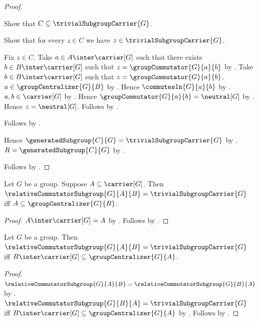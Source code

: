 \begin{proof}
\begin{subproof}
        Show that $C\subseteq\trivialSubgroupCarrier{G}$.
        \begin{subproof}
            Show that for every $z\in C$ we have
                $z\in\trivialSubgroupCarrier{G}$.
            \begin{subproof}
                Fix $z\in C$.
                Take $a\in A\inter\carrier[G]$ such that there exists
                    $b\in B\inter\carrier[G]$ such that
                    $z=\groupCommutator{G}{a}{b}$ by
                    .
                Take $b\in B\inter\carrier[G]$ such that
                    $z=\groupCommutator{G}{a}{b}$.
                $a\in\groupCentralizer{G}{B}$ by .
                Hence $\commutesIn{G}{a}{b}$ by
                    .
                $a,b\in\carrier[G]$ by .
                Hence $\groupCommutator{G}{a}{b}=\neutral[G]$ by
                    .
                Hence $z=\neutral[G]$.
                Follows by
                    .
            \end{subproof}
            Follows by .
        \end{subproof}
        Hence
            $\generatedSubgroup{C}{G}=\trivialSubgroupCarrier{G}$ by
            .
        $R=\generatedSubgroup{C}{G}$ by
            .
    \end{subproof}
    Follows by \auto.
\end{proof}

\begin{corollary}\label{relative_commutator_trivial_iff_subset_centralizer}
    Let $G$ be a group.
    Suppose $A\subseteq\carrier[G]$.
    Then
        $\relativeCommutatorSubgroup{G}{A}{B}=
            \trivialSubgroupCarrier{G}$ iff
        $A\subseteq\groupCentralizer{G}{B}$.
\end{corollary}
\begin{proof}
    $A\inter\carrier[G]=A$ by
        .
    Follows by
        .
\end{proof}

\begin{theorem}\label{relative_commutator_trivial_iff_right_trace_subset_centralizer}
    Let $G$ be a group.
    Then
        $\relativeCommutatorSubgroup{G}{A}{B}=
            \trivialSubgroupCarrier{G}$ iff
        $B\inter\carrier[G]\subseteq\groupCentralizer{G}{A}$.
\end{theorem}
\begin{proof}
    $\relativeCommutatorSubgroup{G}{A}{B}=
        \relativeCommutatorSubgroup{G}{B}{A}$ by
        .
    $\relativeCommutatorSubgroup{G}{B}{A}=
        \trivialSubgroupCarrier{G}$ iff
        $B\inter\carrier[G]\subseteq\groupCentralizer{G}{A}$ by
        .
    Follows by \auto.
\end{proof}

